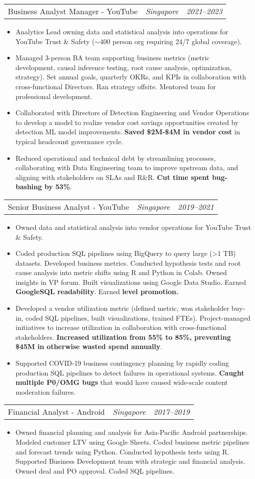 \documentclass[letterpaper,11pt]{article}
\makeatletter
\newcommand{\resumeItem}[1]{
  \item\small{
    {#1}
  }
}
\newcommand{\resumePosition}[3]{
  \item
    \begin{tabular*}{0.96\textwidth}[t]{p{9cm}p{6cm}@{\extracolsep{\fill}}r}
      #1 & \textit{#2} & \textit{#3} \\
    \end{tabular*}
}
\newcommand{\resumeItemListStart}{\begin{itemize}[label=-]}
\newcommand{\resumeItemListEnd}{\end{itemize}}
\makeatother
\begin{document}
          \resumePosition{Business Analyst Manager - YouTube}{Singapore}{2021–2023}
            \resumeItemListStart
              \resumeItem{Analytics Lead owning data and statistical analysis into operations for YouTube Trust \& Safety ($\sim$400 person org requiring 24/7 global coverage).}
              \resumeItem{Managed 3-person BA team supporting business metrics (metric development, causal inference testing, root cause analysis, optimization, strategy). Set annual goals, quarterly OKRs, and KPIs in collaboration with cross-functional Directors. Ran strategy offsite. Mentored team for professional development.}
              \resumeItem{Collaborated with Directors of Detection Engineering and Vendor Operations to develop a model to realize vendor cost savings opportunities created by detection ML model improvements. \textbf{Saved \$2M-\$4M in vendor cost} in typical headcount governance cycle.}
              \resumeItem{Reduced operational and technical debt by streamlining processes, collaborating with Data Engineering team to improve upstream data, and aligning with stakeholders on SLAs and R\&R. \textbf{Cut time spent bug-bashing by 53\%}.}
            \resumeItemListEnd
    
          \resumePosition{Senior Business Analyst - YouTube}{Singapore}{2019–2021}
            \resumeItemListStart
              \resumeItem{Owned data and statistical analysis into vendor operations for YouTube Trust \& Safety.}
              \resumeItem{Coded production SQL pipelines using BigQuery to query large (\textgreater 1 TB) datasets. Developed business metrics. Conducted hypothesis tests and root cause analysis into metric shifts using R and Python in Colab. Owned insights in VP forum. Built visualizations using Google Data Studio. Earned \textbf{GoogleSQL readability}. Earned \textbf{level promotion.}}
              \resumeItem{Developed a vendor utilization metric (defined metric, won stakeholder buy-in, coded SQL pipelines, built visualizations, trained FTEs). Project-managed initiatives to increase utilization in collaboration with cross-functional stakeholders. \textbf{Increased utilization from 55\% to 85\%, preventing \$45M in otherwise wasted spend annually}.}
              \resumeItem{Supported COVID-19 business contingency planning by rapidly coding production SQL pipelines to detect failures in operational systems. \textbf{Caught multiple P0/OMG bugs} that would have caused wide-scale content moderation failures.}
            \resumeItemListEnd
        
        \resumePosition
          {Financial Analyst - Android}{Singapore}{2017–2019}
          \resumeItemListStart
            \resumeItem{Owned financial planning and analysis for Asia-Pacific Android partnerships. Modeled customer LTV using Google Sheets. Coded business metric pipelines and forecast trends using Python. Conducted hypothesis tests using R. Supported Business Development team with strategic and financial analysis. Owned deal and PO approval. Coded SQL pipelines.}
          \resumeItemListEnd
          
\end{document}
